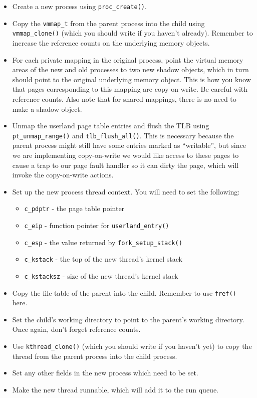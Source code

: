 \begin{itemize}
    \item Create a new process using \texttt{proc\_create()}.
    \item Copy the \texttt{vmmap\_t} from the parent process into the child using \texttt{vmmap\_clone()} (which you should write if you haven't already). Remember to increase the reference counts on the underlying memory objects.
    \item For each private mapping in the original process, point the virtual memory areas of the new and old processes to two new shadow objects, which in turn should point to the original underlying memory object. This is how you know that pages corresponding to this mapping are copy-on-write. Be careful with reference counts. Also note that for shared mappings, there is no need to make a shadow object.
    \item Unmap the userland page table entries and flush the TLB using \texttt{pt\_unmap\_range()} and \texttt{tlb\_flush\_all()}. This is necessary because the parent process might still have some entries marked as ``writable'', but since we are implementing copy-on-write we would like access to these pages to cause a trap to our page fault handler so it can dirty the page, which will invoke the copy-on-write actions.
    \item Set up the new process thread context. You will need to set the following:
        \begin{itemize}
            \item \texttt{c\_pdptr} - the page table pointer
            \item \texttt{c\_eip} - function pointer for \texttt{userland\_entry()}
            \item \texttt{c\_esp} - the value returned by \texttt{fork\_setup\_stack()}
            \item \texttt{c\_kstack} - the top of the new thread's kernel stack
            \item \texttt{c\_kstacksz} - size of the new thread's kernel stack
        \end{itemize}
    \item Copy the file table of the parent into the child. Remember to use \texttt{fref()} here.
    \item Set the child's working directory to point to the parent's working directory. Once again, don't forget reference counts.
    \item Use \texttt{kthread\_clone()} (which you should write if you haven't yet) to copy the thread from the parent process into the child process.
    \item Set any other fields in the new process which need to be set.
    \item Make the new thread runnable, which will add it to the run queue.
\end{itemize}

